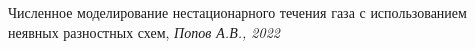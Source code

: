 \documentclass[specialist, subf, href, colorlinks=true, 14pt, times, mtpro, final]{disser}
\theoremstyle{definition}
\begin{document}
	
	
	\tableofcontents
	\newpage
	
	
	
	
	

	\newpage
	\begin{thebibliography}{100}
		 Численное моделирование нестационарного течения газа с использованием неявных разностных схем, \emph{Попов А.В., 2022}

	\end{thebibliography}
\end{document}
